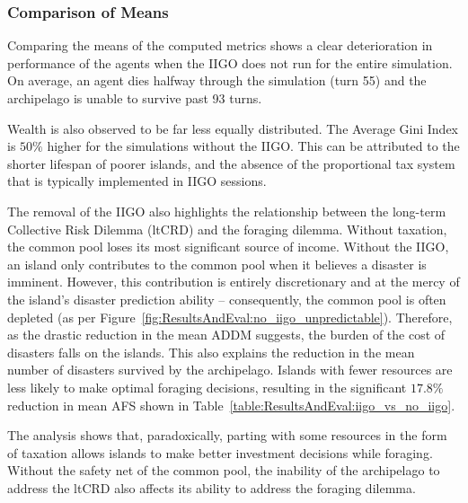 \subsubsection{Comparison of Means}
\label{subsec:ResultsAndEval:no-iigo:comparison_of_means}
Comparing the means of the computed metrics shows a clear deterioration in performance of the agents when the IIGO does not run for the entire simulation. 
On average, an agent dies halfway through the simulation (turn 55) and the archipelago is unable to survive past 93 turns. 

Wealth is also observed to be far less equally distributed. The Average Gini Index is $50\%$ higher for the simulations without the IIGO. This can be attributed to the shorter lifespan of poorer islands, and the absence of the proportional tax system that is typically implemented in IIGO sessions. 

The removal of the IIGO also highlights the relationship between the long-term Collective Risk Dilemma (ltCRD) and the foraging dilemma. Without taxation, the common pool loses its most significant source of income. 
Without the IIGO, an island only contributes to the common pool when it believes a disaster is imminent. However, this contribution is entirely discretionary and at the mercy of the island's disaster prediction ability -- consequently, the common pool is often depleted (as per Figure~\ref{fig:ResultsAndEval:no_iigo_unpredictable}). 
Therefore, as the drastic reduction in the mean ADDM suggests, the burden of the cost of disasters falls on the islands. This also explains the reduction in the mean number of disasters survived by the archipelago. Islands with fewer resources are less likely to make optimal foraging decisions, resulting in the significant $17.8\%$ reduction in mean AFS shown in Table~\ref{table:ResultsAndEval:iigo_vs_no_iigo}.

The analysis shows that, paradoxically, parting with some resources in the form of taxation allows islands to make better investment decisions while foraging. Without the safety net of the common pool, the inability of the archipelago to address the ltCRD also affects its ability to address the foraging dilemma.


